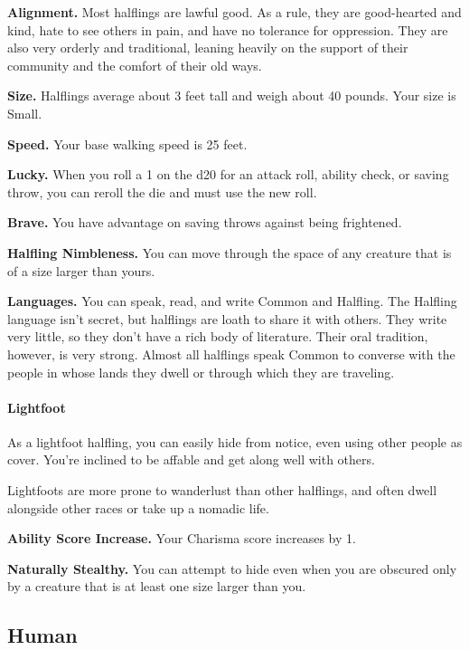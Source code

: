 \textbf{Alignment.} Most halflings are lawful good. As a rule, they are
good-hearted and kind, hate to see others in pain, and have no tolerance
for oppression. They are also very orderly and traditional, leaning
heavily on the support of their community and the comfort of their old
ways.

\textbf{Size.} Halflings average about 3 feet tall and weigh about 40
pounds. Your size is Small.

\textbf{Speed.} Your base walking speed is 25 feet.

\textbf{Lucky.} When you roll a 1 on the d20 for an attack roll, ability
check, or saving throw, you can reroll the die and must use the new
roll.

\textbf{Brave.} You have advantage on saving throws against being
frightened.

\textbf{Halfling Nimbleness.} You can move through the space of any
creature that is of a size larger than yours.

\textbf{Languages.} You can speak, read, and write Common and Halfling.
The Halfling language isn't secret, but halflings are loath to share it
with others. They write very little, so they don't have a rich body of
literature. Their oral tradition, however, is very strong. Almost all
halflings speak Common to converse with the people in whose lands they
dwell or through which they are traveling.

\hypertarget{lightfoot}{%
\paragraph{Lightfoot}\label{lightfoot}}

As a lightfoot halfling, you can easily hide from notice, even using
other people as cover. You're inclined to be affable and get along well
with others.

Lightfoots are more prone to wanderlust than other halflings, and often
dwell alongside other races or take up a nomadic life.

\textbf{Ability Score Increase.} Your Charisma score increases by 1.

\textbf{Naturally Stealthy.} You can attempt to hide even when you are
obscured only by a creature that is at least one size larger than you.

\hypertarget{human}{%
\subsection{Human}\label{human}}

